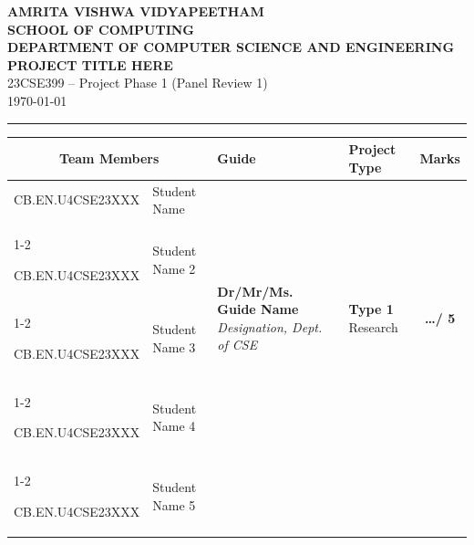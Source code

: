 \documentclass[11pt, a4paper]{article}
\begin{document}
\noindent
\begin{minipage}{\textwidth}
    \centering
    {\Large \textbf{\textcolor{amritaMaroon}{
    AMRITA VISHWA VIDYAPEETHAM \\
    SCHOOL OF COMPUTING \\
    DEPARTMENT OF COMPUTER SCIENCE AND ENGINEERING \\
    }}} 
    \vspace{0.2cm}
    {\large \textbf{PROJECT TITLE HERE}} \\
    \vspace{0.1cm}
    23CSE399 -- Project Phase 1 (Panel Review 1)\\
    \today %
\end{minipage}

\vspace{0.3cm}
\hrule
\vspace{0.3cm}

\noindent
\begin{center}
    \renewcommand{\arraystretch}{1.5}
    \setlength{\tabcolsep}{5pt}
    \begin{tabular}{|l|p{4.2cm}|p{4cm}|p{2.5cm}|c|}
        \hline
        \multicolumn{2}{|c|}{\textbf{Team Members}} & \textbf{Guide} & \textbf{Project Type} & \textbf{Marks} \\ 
        \hline
        
        \small CB.EN.U4CSE23XXX & \small \raggedright Student Name & 
        \multirow{4}{=}{\raggedright \small \textbf{Dr/Mr/Ms. Guide Name} \newline \textit{Designation, \newline Dept. of CSE}} & 
        \multirow{4}{=}{\raggedright \small \textbf{Type 1} \newline Research} & 
        \multirow{4}{*}{\textbf{\huge \dots / 5}} \\ \cline{1-2}
        
        \small CB.EN.U4CSE23XXX & \small Student Name 2 & & & \\ \cline{1-2}
        
        \small CB.EN.U4CSE23XXX & \small Student Name 3 & & & \\ \cline{1-2}
        
        \small CB.EN.U4CSE23XXX & \small Student Name 4 & & & \\ 
        \cline{1-2}
        
        \small CB.EN.U4CSE23XXX & \small Student Name 5 & & & \\ 
        \hline
    \end{tabular}
\end{center}
\vspace{0.2cm}
\end{document}
